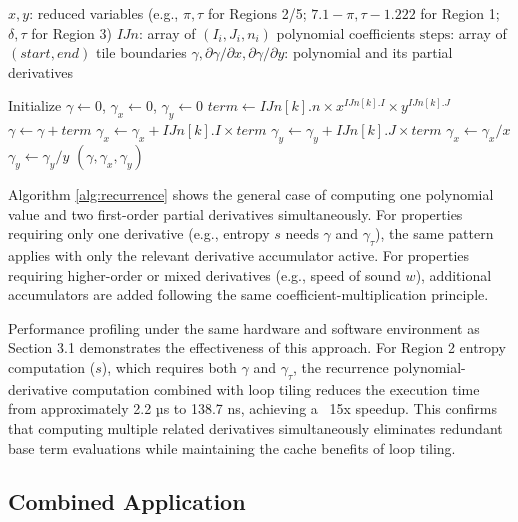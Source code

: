 \documentclass{article}
\begin{document}
\begin{algorithm}[H]
\caption{Recurrence Polynomial-Derivative Computation with Loop Tiling}
\label{alg:recurrence}
\begin{algorithmic}[1]
\REQUIRE $x, y$: reduced variables (e.g., $\pi, \tau$ for Regions 2/5; $7.1{-}\pi, \tau{-}1.222$ for Region 1; $\delta, \tau$ for Region 3)
\REQUIRE $IJn$: array of $(I_i, J_i, n_i)$ polynomial coefficients
\REQUIRE $\text{steps}$: array of $(start, end)$ tile boundaries
\ENSURE $\gamma, \partial\gamma/\partial x, \partial\gamma/\partial y$: polynomial and its partial derivatives

\STATE Initialize $\gamma \leftarrow 0$, $\gamma_x \leftarrow 0$, $\gamma_y \leftarrow 0$
        \STATE $term \leftarrow IJn[k].n \times x^{IJn[k].I} \times y^{IJn[k].J}$
        \STATE $\gamma \leftarrow \gamma + term$
        \STATE $\gamma_x \leftarrow \gamma_x + IJn[k].I \times term$
        \STATE $\gamma_y \leftarrow \gamma_y + IJn[k].J \times term$
    \ENDFOR
\ENDFOR
\STATE $\gamma_x \leftarrow \gamma_x / x$
\STATE $\gamma_y \leftarrow \gamma_y / y$
\RETURN $(\gamma, \gamma_x, \gamma_y)$
\end{algorithmic}
\end{algorithm}

Algorithm \ref{alg:recurrence} shows the general case of computing one polynomial value and two first-order partial derivatives simultaneously. For properties requiring only one derivative (e.g., entropy $s$ needs $\gamma$ and $\gamma_\tau$), the same pattern applies with only the relevant derivative accumulator active. For properties requiring higher-order or mixed derivatives (e.g., speed of sound $w$), additional accumulators are added following the same coefficient-multiplication principle.

Performance profiling under the same hardware and software environment as Section 3.1 demonstrates the effectiveness of this approach. For Region 2 entropy computation ($s$), which requires both $\gamma$ and $\gamma_\tau$, the recurrence polynomial-derivative computation combined with loop tiling reduces the execution time from approximately 2.2 µs to 138.7 ns, achieving a ~15x speedup. This confirms that computing multiple related derivatives simultaneously eliminates redundant base term evaluations while maintaining the cache benefits of loop tiling.

\subsection{Combined Application}
\end{document}
